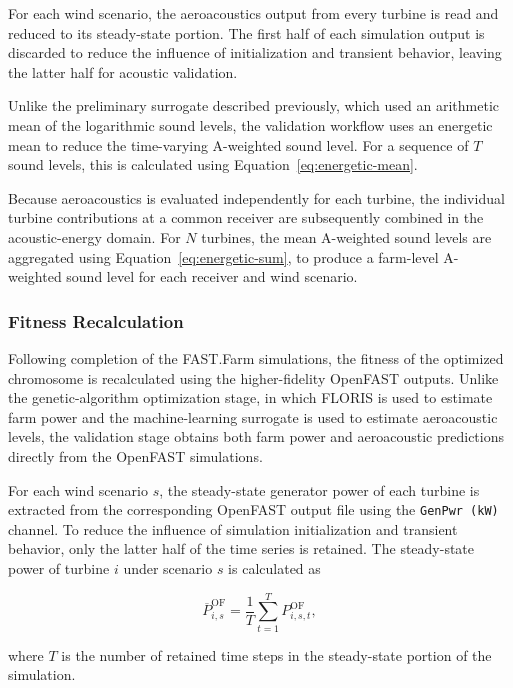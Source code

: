 \documentclass[11pt]{article}
\begin{document}
For each wind scenario, the aeroacoustics output from every turbine is read and reduced to its steady-state portion. The first half of each simulation output is discarded to reduce the influence of initialization and transient behavior, leaving the latter half for acoustic validation.

Unlike the preliminary surrogate described previously, which used an arithmetic mean of the logarithmic sound levels, the validation workflow uses an energetic mean to reduce the time-varying A-weighted sound level. For a sequence of $T$ sound levels, this is calculated using Equation~\ref{eq:energetic-mean}.

Because aeroacoustics is evaluated independently for each turbine, the individual turbine contributions at a common receiver are subsequently combined in the acoustic-energy domain. For $N$ turbines, the mean A-weighted sound levels are aggregated using Equation~\ref{eq:energetic-sum}, to produce a farm-level A-weighted sound level for each receiver and wind scenario.

\subsubsection{Fitness Recalculation}

Following completion of the FAST.Farm simulations, the fitness of the optimized chromosome is recalculated using the higher-fidelity OpenFAST outputs. Unlike the genetic-algorithm optimization stage, in which FLORIS is used to estimate farm power and the machine-learning surrogate is used to estimate aeroacoustic levels, the validation stage obtains both farm power and aeroacoustic predictions directly from the OpenFAST simulations.

For each wind scenario $s$, the steady-state generator power of each turbine is extracted from the corresponding OpenFAST output file using the \texttt{GenPwr (kW)} channel. To reduce the influence of simulation initialization and transient behavior, only the latter half of the time series is retained. The steady-state power of turbine $i$ under scenario $s$ is calculated as

\begin{equation}
    \overline{P}_{i,s}^{\mathrm{OF}}
    =
    \frac{1}{T}
    \sum_{t=1}^{T}
    P_{i,s,t}^{\mathrm{OF}},
\end{equation}

where $T$ is the number of retained time steps in the steady-state portion of the simulation.
\end{document}
